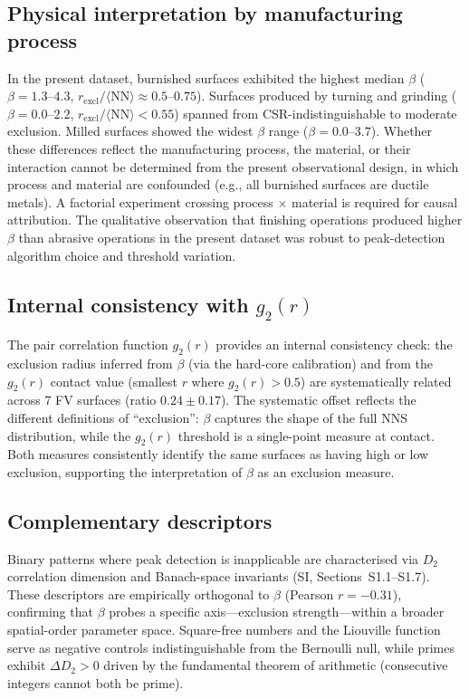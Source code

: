 \documentclass[final,3p,times,twocolumn]{elsarticle}
\theoremstyle{definition}
\begin{document}
\subsection{Physical interpretation by manufacturing process}

In the present dataset, burnished surfaces exhibited the highest
median $\beta$ ($\beta = 1.3$--$4.3$, $r_{\text{excl}}/\langle\text{NN}\rangle
\approx 0.5$--$0.75$). Surfaces produced by turning
and grinding ($\beta = 0.0$--$2.2$, $r_{\text{excl}}/\langle\text{NN}\rangle
< 0.55$) spanned from CSR-indistinguishable to moderate exclusion.
Milled surfaces showed the widest $\beta$ range
($\beta = 0.0$--$3.7$). Whether these differences reflect the
manufacturing process, the material, or their interaction cannot
be determined from the present observational design, in which
process and material are confounded (e.g., all burnished surfaces
are ductile metals). A factorial experiment crossing process
$\times$ material is required for causal attribution. The
qualitative observation that finishing operations produced higher
$\beta$ than abrasive operations in the present dataset was robust
to peak-detection algorithm choice and threshold variation.

\subsection{Internal consistency with $g_2(r)$}

The pair correlation function $g_2(r)$ provides an internal consistency
check: the exclusion radius inferred from $\beta$ (via the hard-core
calibration) and from the $g_2(r)$ contact value (smallest $r$ where
$g_2(r) > 0.5$) are systematically related across 7 FV surfaces (ratio
$0.24 \pm 0.17$). The systematic offset reflects the different
definitions of ``exclusion'': $\beta$ captures the shape of the full
NNS distribution, while the $g_2(r)$ threshold is a single-point
measure at contact. Both measures consistently identify the same
surfaces as having high or low exclusion, supporting the interpretation
of $\beta$ as an exclusion measure.

\subsection{Complementary descriptors}

Binary patterns where peak detection is inapplicable are characterised
via $D_2$ correlation dimension and Banach-space invariants
(SI, Sections~S1.1--S1.7). These descriptors are empirically
orthogonal to $\beta$ (Pearson $r=-0.31$), confirming that $\beta$
probes a specific axis---exclusion strength---within a broader
spatial-order parameter space. Square-free numbers and the Liouville
function serve as negative controls indistinguishable from the
Bernoulli null, while primes exhibit $\Delta D_2>0$ driven by the
fundamental theorem of arithmetic (consecutive integers cannot both
be prime).
\end{document}
